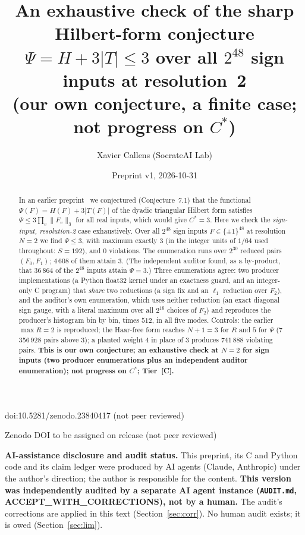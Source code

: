 \documentclass[10pt]{article}
\title{An exhaustive check of the sharp Hilbert-form conjecture\\
$\Psi=H+3|T|\le3$ over all $2^{48}$ sign inputs at resolution~2\\
{\large (our own conjecture, a finite case; not progress on $C^\ast$)}}
\author{Xavier Callens (SocrateAI Lab)}
\date{Preprint v1, 2026-10-31}
\newcommand{\tier}[1]{\textsf{[#1]}}
\newcommand{\tC}{\tier{C}}
\begin{document}
\maketitle
\begin{center}\small doi:10.5281/zenodo.23840417 \quad (not peer reviewed)\end{center}

\begin{center}\small Zenodo DOI to be assigned on release \quad (not peer reviewed)\end{center}

\noindent\textbf{AI-assistance disclosure and audit status.} This preprint, its C and Python code and its claim ledger were
produced by AI agents (Claude, Anthropic) under the author's direction; the author is responsible for the content.
\textbf{This version was independently audited by a separate AI agent instance (\texttt{AUDIT.md}, ACCEPT\_WITH\_CORRECTIONS), not by a human.}
The audit's corrections are applied in this text (Section~\ref{sec:corr}). No human audit exists; it is owed (Section~\ref{sec:lim}).

\begin{abstract}
In an earlier preprint~\cite{dh} we conjectured (Conjecture~7.1) that the functional $\Psi(F)=H(F)+3|T(F)|$ of the dyadic triangular Hilbert form
satisfies $\Psi\le3\prod_v\|F_v\|_3$ for all real inputs, which would give $C^\ast=3$. Here we check the \emph{sign-input, resolution-2} case exhaustively.
Over all $2^{48}$ sign inputs $F\in\{\pm1\}^{48}$ at resolution $N=2$ we find $\Psi\le3$, with maximum exactly $3$ (in the integer units of $1/64$ used throughout: $S=192$), and $0$ violations.
The enumeration runs over $2^{30}$ reduced pairs $(F_0,F_1)$; $4\,608$ of them attain $3$. (The independent auditor found, as a by-product, that $36\,864$ of the $2^{48}$ inputs attain $\Psi=3$.)
Three enumerations agree: two producer implementations (a Python float32 kernel under an exactness guard, and an integer-only C program) that \emph{share} two reductions (a sign fix and an $\ell_1$ reduction over $F_2$), and the auditor's own enumeration, which uses neither reduction (an exact diagonal sign gauge, with a literal maximum over all $2^{16}$ choices of $F_2$) and reproduces the producer's histogram bin by bin, times $512$, in all five modes.
Controls: the earlier $\max R=2$ is reproduced; the Haar-free form reaches $N+1=3$ for $R$ and $5$ for $\Psi$ (7\,356\,928 pairs above $3$); a planted weight $4$ in place of $3$ produces $741\,888$ violating pairs.
\textbf{This is our own conjecture; an exhaustive check at $N=2$ for sign inputs (two producer enumerations plus an independent auditor enumeration); not progress on $C^\ast$; Tier~\tC{}.}

\medskip
\noindent{}
\end{abstract}
\end{document}
